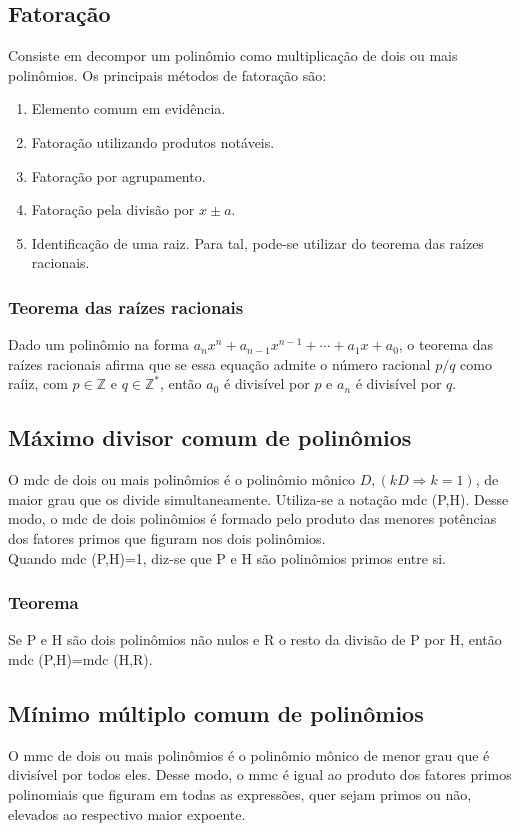 \documentclass{article}
\begin{document}
\subsection{Fatoração}
Consiste em decompor um polinômio como multiplicação de dois ou mais polinômios. Os principais métodos de fatoração são:
\begin{enumerate}[\quad\quad$\bullet$]
    \item Elemento comum em evidência.
    \item Fatoração utilizando produtos notáveis.
    \item Fatoração por agrupamento.
    \item Fatoração pela divisão por $x\pm a$.
    \item Identificação de uma raiz. Para tal, pode-se utilizar do teorema das raízes racionais.
\end{enumerate}
\subsubsection{Teorema das raízes racionais}
Dado um polinômio na forma $a_nx^n+a_{n-1}x^{n-1}+\cdots+a_1x+a_0$, o teorema das raízes racionais afirma que se essa equação admite o número racional $p/q$ como raíiz, com $p\in\mathbb{Z}$ e $q\in\mathbb{Z^*}$, então $a_0$ é divisível por $p$ e $a_n$ é divisível por $q$.

\subsection{Máximo divisor comum de polinômios}
O mdc de dois ou mais polinômios é o polinômio mônico $D, (kD\Rightarrow k=1)$, de maior grau que os divide simultaneamente. Utiliza-se a notação mdc (P,H). Desse modo, o mdc de dois polinômios é formado pelo produto das menores potências dos fatores primos que figuram nos dois polinômios.\\
\indent Quando mdc (P,H)=1, diz-se que P e H são polinômios primos entre si.
\subsubsection{Teorema}
Se P e H são dois polinômios não nulos e R o resto da divisão de P por H, então mdc (P,H)=mdc (H,R). 

\subsection{Mínimo múltiplo comum de polinômios}
O mmc de dois ou mais polinômios é o polinômio mônico de menor grau que é divisível por todos eles. Desse modo, o mmc é igual ao produto dos fatores primos polinomiais que figuram em todas as expressões, quer sejam primos ou não, elevados ao respectivo maior expoente.
\end{document}

